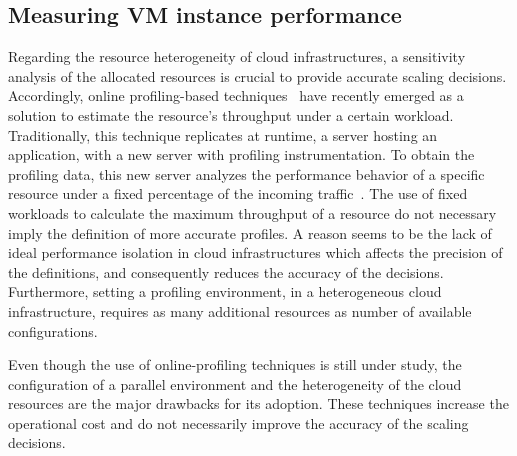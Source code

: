 



\subsection{Measuring VM instance performance \label{profiling}}

Regarding the resource heterogeneity of cloud infrastructures, a sensitivity analysis of the allocated resources is crucial to provide accurate scaling decisions. Accordingly, online profiling-based techniques~\cite{kaviani_profiling-as--service:_2011} have recently emerged as a solution to  estimate the resource's throughput under a certain workload. Traditionally, this technique replicates at runtime, a server hosting an application, with a new server with profiling instrumentation. To obtain  the profiling data, this new server analyzes the performance behavior of a specific resource under a fixed percentage of the incoming traffic~\cite{jiangThesis,dejavu2012}. The use of fixed workloads to calculate the maximum throughput of a resource do not necessary imply the definition of more accurate profiles. A reason seems to be the lack of ideal performance isolation in cloud infrastructures which affects the precision of the definitions, and consequently reduces the accuracy of the decisions. Furthermore, setting a profiling environment, in a heterogeneous cloud infrastructure, requires as many additional resources as number of available configurations. 

Even though the use of online-profiling techniques is still under study, the configuration of a parallel environment and the heterogeneity of the cloud resources are the major drawbacks for its adoption. These techniques increase the operational cost and do not necessarily improve the accuracy of the scaling decisions.

